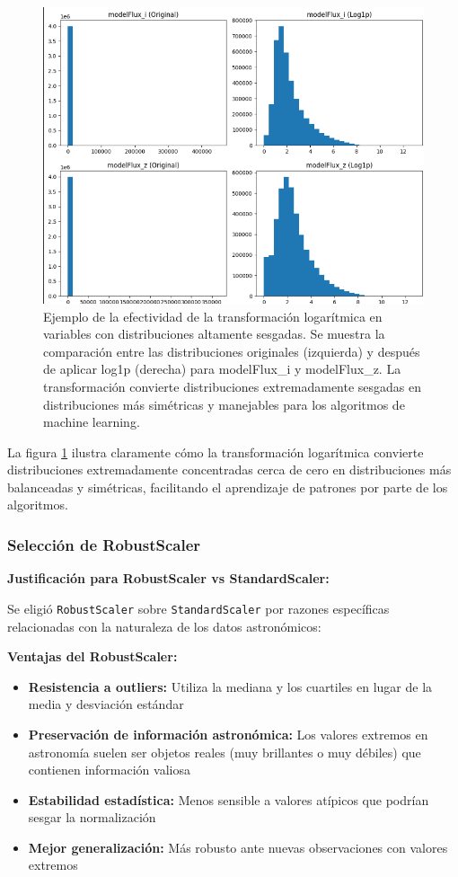 \documentclass{article}
\begin{document}
\begin{figure}[H]
    \centering
    \includegraphics[width=0.8\linewidth]{logaritmica_ejemplo.png}
    \caption{Ejemplo de la efectividad de la transformación logarítmica en variables con distribuciones altamente sesgadas. Se muestra la comparación entre las distribuciones originales (izquierda) y después de aplicar log1p (derecha) para modelFlux\_i y modelFlux\_z. La transformación convierte distribuciones extremadamente sesgadas en distribuciones más simétricas y manejables para los algoritmos de machine learning.}
    \label{fig:transformacion_logaritmica}
\end{figure}

La figura \ref{fig:transformacion_logaritmica} ilustra claramente cómo la transformación logarítmica convierte distribuciones extremadamente concentradas cerca de cero en distribuciones más balanceadas y simétricas, facilitando el aprendizaje de patrones por parte de los algoritmos.

\subsubsection{Selección de RobustScaler}

\textbf{Justificación para RobustScaler vs StandardScaler:}

Se eligió \texttt{RobustScaler} \cite{sklearn_robustscaler} sobre \texttt{StandardScaler} por razones específicas relacionadas con la naturaleza de los datos astronómicos:

\textbf{Ventajas del RobustScaler:}
\begin{itemize}
    \item \textbf{Resistencia a outliers:} Utiliza la mediana y los cuartiles en lugar de la media y desviación estándar
    \item \textbf{Preservación de información astronómica:} Los valores extremos en astronomía suelen ser objetos reales (muy brillantes o muy débiles) que contienen información valiosa
    \item \textbf{Estabilidad estadística:} Menos sensible a valores atípicos que podrían sesgar la normalización
    \item \textbf{Mejor generalización:} Más robusto ante nuevas observaciones con valores extremos
\end{itemize}
\end{document}
